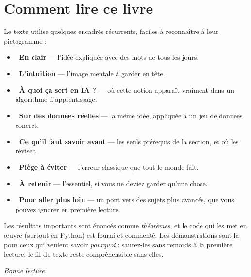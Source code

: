 \section*{Comment lire ce livre}

Le texte utilise quelques encadrés récurrents, faciles à reconnaître à
leur pictogramme :

\begin{itemize}
  \item \textbf{~En clair} — l'idée expliquée avec des
        mots de tous les jours.
  \item \textbf{~L'intuition} — l'image mentale à garder en
        tête.
  \item \textbf{~À quoi ça sert en IA ?} — où cette notion
        apparaît vraiment dans un algorithme d'apprentissage.
  \item \textbf{~Sur des données réelles} — la même
        idée, appliquée à un jeu de données concret.
  \item \textbf{~Ce qu'il faut savoir avant} — les seuls
        prérequis de la section, et où les réviser.
  \item \textbf{~Piège à éviter} — l'erreur
        classique que tout le monde fait.
  \item \textbf{~À retenir} — l'essentiel, si vous ne deviez
        garder qu'une chose.
  \item \textbf{~Pour aller plus loin} — un pont vers des
        sujets plus avancés, que vous pouvez ignorer en première lecture.
\end{itemize}

Les résultats importants sont énoncés comme \emph{théorèmes}, et le code
qui les met en œuvre (surtout en Python) est fourni et commenté. Les
démonstrations sont là pour ceux qui veulent savoir \emph{pourquoi} :
sautez-les sans remords à la première lecture, le fil du texte reste
compréhensible sans elles.

\vspace{1em}
\hfill\textit{Bonne lecture.}
\clearpage
